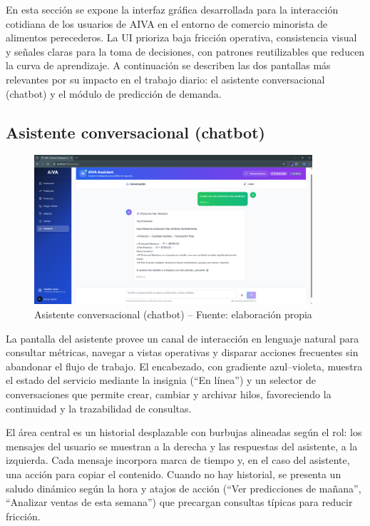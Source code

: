 En esta sección se expone la interfaz gráfica desarrollada para la interacción cotidiana de los usuarios de AIVA en el entorno de comercio minorista de alimentos perecederos. La UI prioriza baja fricción operativa, consistencia visual y señales claras para la toma de decisiones, con patrones reutilizables que reducen la curva de aprendizaje. A continuación se describen las dos pantallas más relevantes por su impacto en el trabajo diario: el asistente conversacional (chatbot) y el módulo de predicción de demanda.

\subsection{Asistente conversacional (chatbot)}
\begin{figure}[!htbp]
  \centering
  \includegraphics[width=0.92\textwidth]{images/chatbotPage.png}
  \caption{Asistente conversacional (chatbot) -- Fuente: elaboración propia}
  \label{fig:ui-chatbot}
\end{figure}
La pantalla del asistente provee un canal de interacción en lenguaje natural para consultar métricas, navegar a vistas operativas y disparar acciones frecuentes sin abandonar el flujo de trabajo. El encabezado, con gradiente azul–violeta, muestra el estado del servicio mediante la insignia (“En línea”) y un selector de conversaciones que permite crear, cambiar y archivar hilos, favoreciendo la continuidad y la trazabilidad de consultas.

El área central es un historial desplazable con burbujas alineadas según el rol: los mensajes del usuario se muestran a la derecha y las respuestas del asistente, a la izquierda. Cada mensaje incorpora marca de tiempo y, en el caso del asistente, una acción para copiar el contenido. Cuando no hay historial, se presenta un saludo dinámico según la hora y atajos de acción (“Ver predicciones de mañana”, “Analizar ventas de esta semana”) que precargan consultas típicas para reducir fricción.

